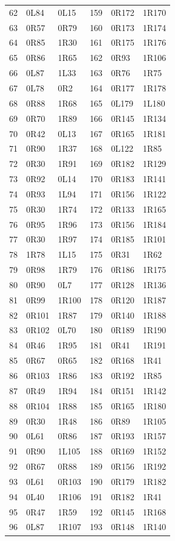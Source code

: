 \begin{longtable}{rll@{\hspace{10mm}}rll}
62 & 0L84 & 0L15 & 159 & 0R172 & 1R170\\
63 & 0R57 & 0R79 & 160 & 0R173 & 1R174\\
64 & 0R85 & 1R30 & 161 & 0R175 & 1R176\\
65 & 0R86 & 1R65 & 162 & 0R93 & 1R106\\
66 & 0L87 & 1L33 & 163 & 0R76 & 1R75\\
67 & 0L78 & 0R2 & 164 & 0R177 & 1R178\\
68 & 0R88 & 1R68 & 165 & 0L179 & 1L180\\
69 & 0R70 & 1R89 & 166 & 0R145 & 1R134\\
70 & 0R42 & 0L13 & 167 & 0R165 & 1R181\\
71 & 0R90 & 1R37 & 168 & 0L122 & 1R85\\
72 & 0R30 & 1R91 & 169 & 0R182 & 1R129\\
73 & 0R92 & 0L14 & 170 & 0R183 & 1R141\\
74 & 0R93 & 1L94 & 171 & 0R156 & 1R122\\
75 & 0R30 & 1R74 & 172 & 0R133 & 1R165\\
76 & 0R95 & 1R96 & 173 & 0R156 & 1R184\\
77 & 0R30 & 1R97 & 174 & 0R185 & 1R101\\
78 & 1R78 & 1L15 & 175 & 0R31 & 1R62\\
79 & 0R98 & 1R79 & 176 & 0R186 & 1R175\\
80 & 0R90 & 0L7 & 177 & 0R128 & 1R136\\
81 & 0R99 & 1R100 & 178 & 0R120 & 1R187\\
82 & 0R101 & 1R87 & 179 & 0R140 & 1R188\\
83 & 0R102 & 0L70 & 180 & 0R189 & 1R190\\
84 & 0R46 & 1R95 & 181 & 0R41 & 1R191\\
85 & 0R67 & 0R65 & 182 & 0R168 & 1R41\\
86 & 0R103 & 1R86 & 183 & 0R192 & 1R85\\
87 & 0R49 & 1R94 & 184 & 0R151 & 1R142\\
88 & 0R104 & 1R88 & 185 & 0R165 & 1R180\\
89 & 0R30 & 1R48 & 186 & 0R89 & 1R105\\
90 & 0L61 & 0R86 & 187 & 0R193 & 1R157\\
91 & 0R90 & 1L105 & 188 & 0R169 & 1R152\\
92 & 0R67 & 0R88 & 189 & 0R156 & 1R192\\
93 & 0L61 & 0R103 & 190 & 0R179 & 1R182\\
94 & 0L40 & 1R106 & 191 & 0R182 & 1R41\\
95 & 0R47 & 1R59 & 192 & 0R145 & 1R168\\
96 & 0L87 & 1R107 & 193 & 0R148 & 1R140\\
\end{longtable}
